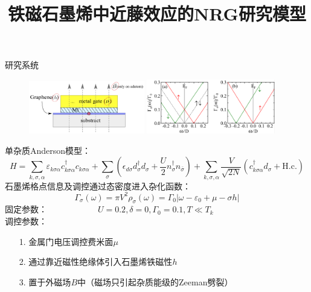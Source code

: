 \documentclass[9pt,t]{beamer} %
\begin{document}
\title{铁磁石墨烯中近藤效应的NRG研究\qquad \qquad \qquad \qquad 模型}
\begin{frame}{研究系统}
\begin{figure}
\includegraphics[width=0.45\textwidth]{setup.png}
\includegraphics[width=0.5\textwidth]{fig1.png}
\end{figure}
单杂质Anderson模型：
\[
H=\sum_{k, \sigma, \alpha} \varepsilon_{k \sigma \alpha} c_{k \sigma \alpha}^{\dagger} c_{k \sigma \alpha}+\sum_{\sigma}\left(\epsilon_{d \sigma} d_{\sigma}^{\dagger} d_{\sigma}+\frac{U}{2} n_{\sigma}^{\dagger} n_{\bar{\sigma}}\right)+\sum_{k, \sigma, \alpha} \frac{V}{\sqrt{2 N}}\left(c_{k \sigma \alpha}^{\dagger} d_{\sigma}+\mathrm{H.c.}\right)
\]
石墨烯格点信息及调控通过态密度进入杂化函数：
\[
\Gamma_{\sigma}(\omega)=\pi V^{2} \rho_{\sigma}(\omega) = \Gamma_{0}\left|\omega-\varepsilon_{0}+\mu-\sigma h\right|
\]
固定参数：$\qquad \qquad \qquad U=0.2,\delta=0,\Gamma_{0}=0.1,T\ll T_{k}$\\
调控参数：
\begin{itemize}
\setlength\itemsep{0.4em}
\item[1.] 金属门电压调控费米面$\mu$
\item[2.] 通过靠近磁性绝缘体引入石墨烯铁磁性$h$
\item[3.] 置于外磁场$B$中（磁场只引起杂质能级的Zeeman劈裂）
\end{itemize}
\end{frame}
\end{document}
